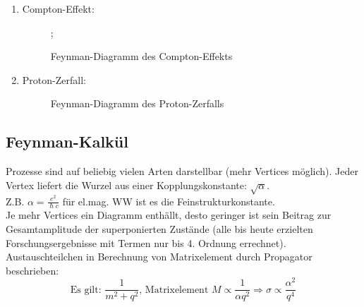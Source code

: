 \documentclass[Ex4_Zusammenfassung.tex]{subfiles}
\begin{document}
\begin{enumerate}
			\item Compton-Effekt:
				\begin{figure}[H]
					\centering
					;
					\caption{Feynman-Diagramm des Compton-Effekts}
				\end{figure}
			\item Proton-Zerfall:
				\begin{figure}[H]
					\centering
					\caption{Feynman-Diagramm des Proton-Zerfalls}
				\end{figure}
	\end{enumerate}
	
	\subsection{Feynman-Kalkül}
	
	Prozesse sind auf beliebig vielen Arten darstellbar (mehr Vertices möglich). Jeder Vertex liefert die Wurzel aus einer Kopplungskonstante: $\sqrt{\alpha}$.\\
	Z.B. $\alpha = \frac{e^2}{\hslash c}$ für el.mag. WW ist es die Feinstrukturkonstante.\\
	Je mehr Vertices ein Diagramm enthällt, desto geringer ist sein Beitrag zur Gesamtamplitude der superponierten Zustände (alle bis heute erzielten Forschungsergebnisse mit Termen nur bis 4. Ordnung errechnet).\\
	Austauschteilchen in Berechnung von Matrixelement durch Propagator beschrieben:
	$$ \text{Es gilt: } \frac{1}{m^2 + q^2} \text{, Matrixelement } M \propto \frac{1}{\alpha q^2} \Rightarrow \sigma \propto \frac{\alpha^2}{q^4}$$
		
	
\end{document}
